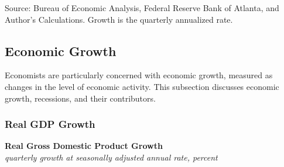 \documentclass{report}
\makeatletter
\newcommand{\tbllink}[1]{\href{https://raw.githubusercontent.com/bdecon/US-chartbook/master/chartbook/data/#1}{\faTable}}
\newcommand*\short[1]{\expandafter\@gobbletwo\number\numexpr#1\relax}
\newcommand{\tsbar}[4]{
		\addplot[ybar stacked, bar width=2.1pt, draw opacity=0, fill=#1] 
			table [x=#2, y=#3, col sep=comma]{#4};}
\newcommand{\absnode}[3]{\node[below right, align=left] at (axis cs: #1,#2) {#3};}
\newcommand{\dateaxisticks}{
		date coordinates in=x, axis line style={draw=none},
		xmax={2023-11-01},
		max space between ticks=40,	    
		xtick={{1990-01-01}, {1992-01-01}, {1994-01-01}, 
			{1996-01-01}, {1998-01-01}, {2000-01-01}, 
			{2002-01-01}, {2004-01-01}, {2006-01-01},
			{2008-01-01}, {2010-01-01}, {2012-01-01}, {2014-01-01},
		    {2016-01-01}, {2018-01-01}, {2020-01-01}, {2022-01-01}, 
		    {2024-01-01}, {2026-01-01}},
		minor xtick={{1989-01-01}, {1991-01-01}, {1993-01-01},
			{1995-01-01}, {1997-01-01}, {1999-01-01}, 
			{2001-01-01}, {2003-01-01}, {2005-01-01}, {2007-01-01},
		    {2009-01-01}, {2011-01-01}, {2013-01-01}, {2015-01-01},
		    {2017-01-01}, {2019-01-01}, {2021-01-01}, {2023-01-01}, 
		    {2025-01-01}, {2027-01-01}},
		enlarge y limits={0.06}, enlarge x limits={0.01},
		}
\newcommand{\bbar}[2]{extra #1 ticks = {{#2}}, extra #1 tick labels = ,
		extra #1 tick style = {grid=major, grid style={thick, black!25}},}
\newcommand{\rbars}{
		\fill[color=black!10] (axis cs:{1990-07-01},\pgfkeysvalueof{/pgfplots/ymin}) rectangle 
			(axis cs:{1991-03-01}, \pgfkeysvalueof{/pgfplots/ymax});
		\fill[color=black!10] (axis cs:{2007-12-01},\pgfkeysvalueof{/pgfplots/ymin}) rectangle 
			(axis cs:{2009-07-01}, \pgfkeysvalueof{/pgfplots/ymax});
		\fill[color=black!10] (axis cs:{2001-03-01},\pgfkeysvalueof{/pgfplots/ymin}) rectangle 
			(axis cs:{2001-11-01}, \pgfkeysvalueof{/pgfplots/ymax});
		\fill[color=black!10] (axis cs:{2020-02-01},\pgfkeysvalueof{/pgfplots/ymin}) rectangle 
			(axis cs:{2020-05-01}, \pgfkeysvalueof{/pgfplots/ymax});}
\makeatother
\begin{document}
\begin{minipage}{0.68\textwidth}		
\footnotesize{Source: Bureau of Economic Analysis, Federal Reserve Bank of Atlanta, and Author's Calculations. Growth is the quarterly annualized rate.}\end{minipage} \hspace{1mm} \begin{minipage}{0.07\textwidth}\hfill \tbllink{gdpjobslvl.csv} \vspace{4mm} \end{minipage}
\newpage
\hypertarget{oegr}{\label{oegr}}
\vspace*{-10mm}

\begin{minipage}{0.76\textwidth} 
\subsection*{Economic Growth}
\small Economists are particularly concerned with economic growth, measured as changes in the level of economic activity. This subsection discusses economic growth, recessions, and their contributors.

\subsubsection*{Real GDP Growth} 
\vspace{-1mm}

\small  
\vspace{1mm}

\normalsize \textbf{Real Gross Domestic Product Growth}\\
\footnotesize{\textit{quarterly growth at seasonally adjusted annual rate, percent}}
\vspace{-5mm}

\hspace*{-2mm} 
\vspace{-3.5mm}


\end{minipage}
\end{document}
